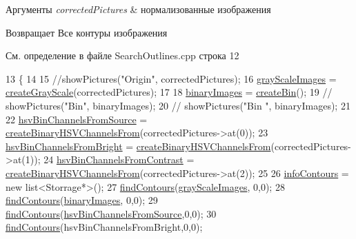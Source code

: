 \begin{DoxyParams}{Аргументы}
{\em corrected\+Pictures} & нормализованные изображения \\
\hline
\end{DoxyParams}
\begin{DoxyReturn}{Возвращает}
Все контуры изображения 
\end{DoxyReturn}


См. определение в файле Search\+Outlines.\+cpp строка 12


\begin{DoxyCode}
13 \{
14 
15     \textcolor{comment}{//showPictures("Origin", correctedPictures);}
16     \hyperlink{class_search_outlines_a2284f3f55022613e11f2d023a6b76e07}{grayScaleImages} = \hyperlink{class_search_outlines_ae2c5d2a7cf350f53dec9e1d966a5045a}{createGrayScale}(correctedPictures);
17 
18     \hyperlink{class_search_outlines_ad32573709b7db29f00e5444110b37d23}{binaryImages} = \hyperlink{class_search_outlines_ac7706a914bd5abb1d2f21ecf13192461}{createBin}();
19 \textcolor{comment}{//    showPictures("Bin", binaryImages);}
20 \textcolor{comment}{//    showPictures("Bin ", binaryImages);}
21 
22     \hyperlink{class_search_outlines_a455efed931c502f14dbf88c87974214d}{hsvBinChannelsFromSource} = 
      \hyperlink{class_search_outlines_afb719de91ae7c9c8bcaf7e731223d9d5}{createBinaryHSVChannelsFrom}(correctedPictures->at(0));
23     \hyperlink{class_search_outlines_a1eb23566d056c92a441067d8c9cd03ae}{hsvBinChannelsFromBright} = 
      \hyperlink{class_search_outlines_afb719de91ae7c9c8bcaf7e731223d9d5}{createBinaryHSVChannelsFrom}(correctedPictures->at(1));
24     \hyperlink{class_search_outlines_a236b9910b73900271297548d3744d506}{hsvBinChannelsFromContrast} = 
      \hyperlink{class_search_outlines_afb719de91ae7c9c8bcaf7e731223d9d5}{createBinaryHSVChannelsFrom}(correctedPictures->at(2));
25 
26     \hyperlink{class_search_outlines_a1b1d7e6dd5c6c2b30c397f9f6d712dd1}{infoContours} = \textcolor{keyword}{new} list<Storrage*>();
27     \hyperlink{class_search_outlines_a9885ced6ec7391c1a702f6b03bf4fe14}{findContours}(\hyperlink{class_search_outlines_a2284f3f55022613e11f2d023a6b76e07}{grayScaleImages}, 0,0);
28     \hyperlink{class_search_outlines_a9885ced6ec7391c1a702f6b03bf4fe14}{findContours}(\hyperlink{class_search_outlines_ad32573709b7db29f00e5444110b37d23}{binaryImages}, 0,0);
29     \hyperlink{class_search_outlines_a9885ced6ec7391c1a702f6b03bf4fe14}{findContours}(\hyperlink{class_search_outlines_a455efed931c502f14dbf88c87974214d}{hsvBinChannelsFromSource},0,0);
30     \hyperlink{class_search_outlines_a9885ced6ec7391c1a702f6b03bf4fe14}{findContours}(hsvBinChannelsFromBright,0,0);

\end{DoxyCode}
